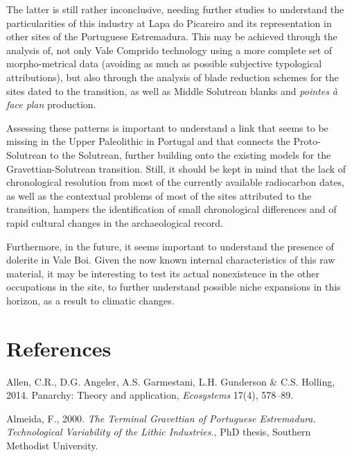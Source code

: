 \documentclass[12pt,twoside]{reedthesis}
\begin{document}
The latter is still rather inconclusive, needing further studies to understand the particularities of this industry at Lapa do Picareiro and its representation in other sites of the Portuguese Estremadura. This may be achieved through the analysis of, not only Vale Comprido technology using a more complete set of morpho-metrical data (avoiding as much as possible subjective typological attributions), but also through the analysis of blade reduction schemes for the sites dated to the transition, as well as Middle Solutrean blanks and \emph{pointes à face plan} production.

Assessing these patterns is important to understand a link that seems to be missing in the Upper Paleolithic in Portugal and that connects the Proto-Solutrean to the Solutrean, further building onto the existing models for the Gravettian-Solutrean transition. Still, it should be kept in mind that the lack of chronological resolution from most of the currently available radiocarbon dates, as well as the contextual problems of most of the sites attributed to the transition, hampers the identification of small chronological differences and of rapid cultural changes in the archaeological record.

Furthermore, in the future, it seems important to understand the presence of dolerite in Vale Boi. Given the now known internal characteristics of this raw material, it may be interesting to test its actual nonexistence in the other occupations in the site, to further understand possible niche expansions in this horizon, as a result to climatic changes.

\hypertarget{references}{%
\chapter*{References}\label{references}}


\noindent
\singlespacing

\setlength{\parindent}{-0.20in}
\setlength{\leftskip}{0.20in}
\setlength{\parskip}{8pt}

\hypertarget{refs}{}
\leavevmode\hypertarget{ref-allen2014}{}%
Allen, C.R., D.G. Angeler, A.S. Garmestani, L.H. Gunderson \& C.S. Holling, 2014. Panarchy: Theory and application, \emph{Ecosystems} 17(4), 578--89.

\leavevmode\hypertarget{ref-almeida2000}{}%
Almeida, F., 2000. \emph{\textup{The Terminal Gravettian of Portuguese Estremadura. Technological Variability of the Lithic Industries.}}, PhD thesis, Southern Methodist University.
\end{document}
